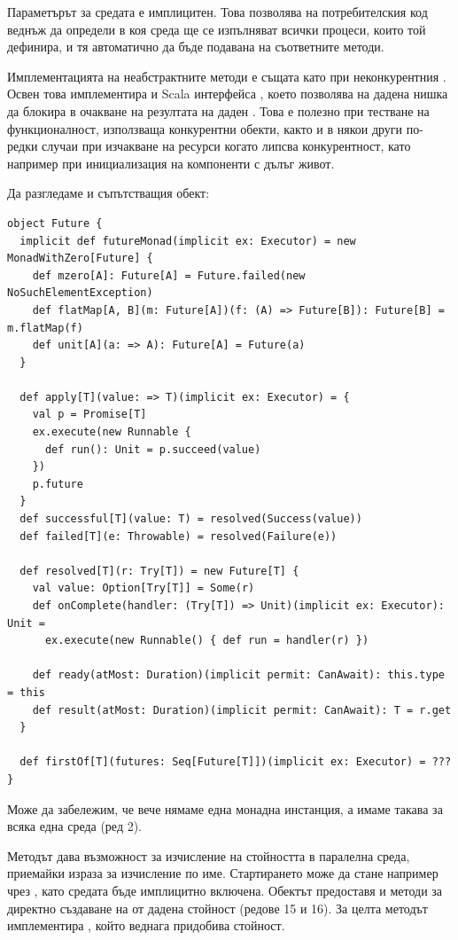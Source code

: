Параметърът за средата е имплицитен. Това позволява на потребителския код веднъж да определи в коя среда ще се изпълняват всички процеси, които той дефинира, и тя автоматично да бъде подавана на съответните методи.

Имплементацията на неабстрактните методи е същата като при неконкурентния . Освен това  имплементира и Scala интерфейса , което позволява на дадена нишка да блокира в очакване на резултата на даден . Това е полезно при тестване на функционалност, използваща конкурентни  обекти, както и в някои други по-редки случаи при изчакване на ресурси когато липсва конкурентност, като например при инициализация на компоненти с дълъг живот.

Да разгледаме и съпътстващия обект:

\begin{lstlisting}[style=listing, caption={Конкурентен \englishterm{future} (съпътстващ обект)}]
object Future {
  implicit def futureMonad(implicit ex: Executor) = new MonadWithZero[Future] {
    def mzero[A]: Future[A] = Future.failed(new NoSuchElementException)
    def flatMap[A, B](m: Future[A])(f: (A) => Future[B]): Future[B] = m.flatMap(f)
    def unit[A](a: => A): Future[A] = Future(a)
  }

  def apply[T](value: => T)(implicit ex: Executor) = {
    val p = Promise[T]
    ex.execute(new Runnable {
      def run(): Unit = p.succeed(value)
    })
    p.future
  }
  def successful[T](value: T) = resolved(Success(value))
  def failed[T](e: Throwable) = resolved(Failure(e))

  def resolved[T](r: Try[T]) = new Future[T] {
    val value: Option[Try[T]] = Some(r)
    def onComplete(handler: (Try[T]) => Unit)(implicit ex: Executor): Unit =
      ex.execute(new Runnable() { def run = handler(r) })

    def ready(atMost: Duration)(implicit permit: CanAwait): this.type = this
    def result(atMost: Duration)(implicit permit: CanAwait): T = r.get
  }

  def firstOf[T](futures: Seq[Future[T]])(implicit ex: Executor) = ???
}
\end{lstlisting}

Може да забележим, че вече нямаме една монадна инстанция, а имаме такава за всяка една среда (ред 2).

Методът  дава възможност за изчисление на стойността в паралелна среда, приемайки израза за изчисление по име. Стартирането може да стане например чрез , като средата бъде имплицитно включена. Обектът предоставя и методи за директно създаване на  от дадена стойност (редове 15 и 16). За целта методът  имплементира , който веднага придобива стойност.

